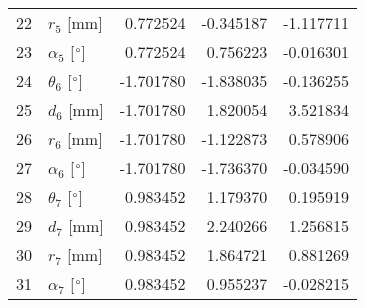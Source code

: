 \documentclass{standalone}%
\begin{document}
\begin{tabular}{llrrr}
22 &              $r_{5}$ [mm] &  0.772524 &  -0.345187 &  -1.117711 \\
23 &  $\alpha_{5}$ [$\degree$] &  0.772524 &   0.756223 &  -0.016301 \\
24 &  $\theta_{6}$ [$\degree$] & -1.701780 &  -1.838035 &  -0.136255 \\
25 &              $d_{6}$ [mm] & -1.701780 &   1.820054 &   3.521834 \\
26 &              $r_{6}$ [mm] & -1.701780 &  -1.122873 &   0.578906 \\
27 &  $\alpha_{6}$ [$\degree$] & -1.701780 &  -1.736370 &  -0.034590 \\
28 &  $\theta_{7}$ [$\degree$] &  0.983452 &   1.179370 &   0.195919 \\
29 &              $d_{7}$ [mm] &  0.983452 &   2.240266 &   1.256815 \\
30 &              $r_{7}$ [mm] &  0.983452 &   1.864721 &   0.881269 \\
31 &  $\alpha_{7}$ [$\degree$] &  0.983452 &   0.955237 &  -0.028215 \\
\bottomrule
\end{tabular}
%
\end{document}

